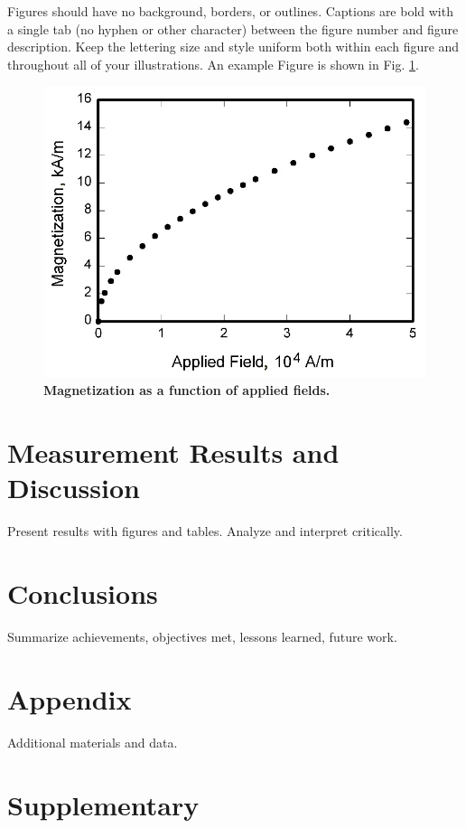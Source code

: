 \documentclass{engr1000j-s2}
\begin{document}
  Figures should have no background, borders, or outlines. Captions are bold with a single tab (no hyphen or other character) between the figure number and figure description. Keep the lettering size and style uniform both within each figure and throughout all of your illustrations.  An example Figure is shown in Fig. \ref{fig:graph}.


  \begin{figure}[hbt!]  
  \centering
  \includegraphics[width=.5\textwidth]{figures/graph.jpg}
  \caption{\quad \textbf{Magnetization as a function of applied fields.}}
  \label{fig:graph}
  \end{figure}

  \hspace{1em}
  
  \section{Measurement Results and Discussion}
  Present results with figures and tables. Analyze and interpret critically.

  \hspace{1em}

  \section{Conclusions}
  Summarize achievements, objectives met, lessons learned, future work.

  \hspace{1em}

  

  \newpage
  \appendix
  \section{Appendix}
  Additional materials and data.

  \newpage
  \section{Supplementary}
\end{document}
